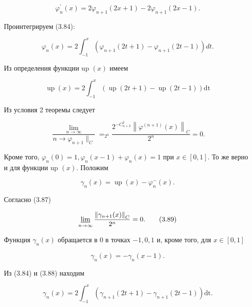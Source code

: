 \documentclass[10pt]{article}
\begin{document}
\begin{equation*}
\varphi_{n}^{\prime}(x)=2 \varphi_{n+1}(2 x+1)-2 \varphi_{n+1}(2 x-1) . \tag{3.84}
\end{equation*}


Проинтегрируем (3.84):


\begin{equation*}
\varphi_{n}(x)=2 \int_{-1}^{x}\left(\varphi_{n+1}(2 t+1)-\varphi_{n+1}(2 t-1)\right) d t . \tag{8.85}
\end{equation*}


Из определения функции up $(x)$ имеем


\begin{equation*}
\operatorname{up}(x)=2 \int_{-1}^{x}(\operatorname{up}(2 t+1)-\operatorname{up}(2 t-1)) \mathrm{dt} \tag{3.86}
\end{equation*}


Из условия 2 теоремы следует


\begin{equation*}
\frac{\lim _{n \rightarrow \infty}}{n \rightarrow \varphi_{n+1} \|_{C}}=_{2^{n}} \frac{2^{-C_{n+2}^{2}}\left\|\varphi^{(n+1)}(x)\right\|_{C}}{2^{n}}=0 . \tag{3.87}
\end{equation*}


Кроме того, $\varphi_{n}(0)=1, \varphi_{n}(x-1)+\varphi_{n}(x)=1$ при $x \in[0,1]$. То же верно и для функции up $(x)$. Положим


\begin{equation*}
\gamma_{n}(x)=\operatorname{up}(x)-\varphi_{n}^{-}(x) . \tag{3.88}
\end{equation*}


Согласно (3.87)


\begin{equation*}
\varliminf_{n \rightarrow \infty} \frac{\left\|\gamma_{n+1}(x)\right\|_{C}}{2^{n}}=0 . \tag{3.89}
\end{equation*}


Функция $\gamma_{n}(x)$ обращается в 0 в точках $-1,0,1$ и, кроме того, для $x \in[0,1]$


\begin{equation*}
\gamma_{n}(x)=-\gamma_{n}(x-1) . \tag{3.90}
\end{equation*}


Из (3.84) и (3.88) находим


\begin{equation*}
\gamma_{n}(x)=2 \int_{-1}^{x}\left(\gamma_{n+1}(2 t+1)-\gamma_{n+1}(2 t-1)\right) \mathrm{dt} . \tag{3.91}
\end{equation*}
\end{document}
